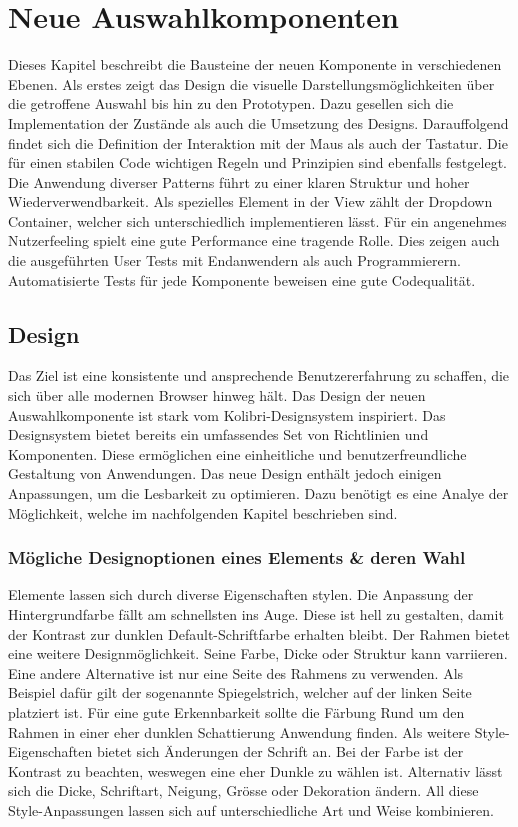 \chapter{Neue Auswahlkomponenten}
\label{chap:newComponent}

Dieses Kapitel beschreibt die Bausteine der neuen Komponente in verschiedenen Ebenen. 
Als erstes zeigt das Design die visuelle Darstellungsmöglichkeiten über die getroffene Auswahl bis hin zu den Prototypen. 
Dazu gesellen sich die Implementation der Zustände als auch die Umsetzung des Designs.
Darauffolgend findet sich die Definition der Interaktion mit der Maus als auch der Tastatur. 
Die für einen stabilen Code wichtigen Regeln und Prinzipien sind ebenfalls festgelegt. 
Die Anwendung diverser Patterns führt zu einer klaren Struktur und hoher Wiederverwendbarkeit. 
Als spezielles Element in der View zählt der Dropdown Container, welcher sich unterschiedlich implementieren lässt. 
Für ein angenehmes Nutzerfeeling spielt eine gute Performance eine tragende Rolle. 
Dies zeigen auch die ausgeführten User Tests mit Endanwendern als auch Programmierern. 
Automatisierte Tests für jede Komponente beweisen eine gute Codequalität. 


\section{Design}
\label{sec:design}

Das Ziel ist eine konsistente und ansprechende Benutzererfahrung zu schaffen, die sich über alle modernen Browser hinweg hält. 
Das Design der neuen Auswahlkomponente ist stark vom Kolibri-Designsystem inspiriert. 
Das Designsystem bietet bereits ein umfassendes Set von Richtlinien und Komponenten. 
Diese ermöglichen eine einheitliche und benutzerfreundliche Gestaltung von Anwendungen. 
Das neue Design enthält jedoch einigen Anpassungen, um die Lesbarkeit zu optimieren. 
Dazu benötigt es eine Analye der Möglichkeit, welche im nachfolgenden Kapitel beschrieben sind. 


\subsection{Mögliche Designoptionen eines Elements \& deren Wahl}
\label{sec:possibleDesignOptions}

Elemente lassen sich durch diverse Eigenschaften stylen. 
Die Anpassung der Hintergrundfarbe fällt am schnellsten ins Auge. 
Diese ist hell zu gestalten, damit der Kontrast zur dunklen Default-Schriftfarbe erhalten bleibt. 
Der Rahmen bietet eine weitere Designmöglichkeit. 
Seine Farbe, Dicke oder Struktur kann varriieren. 
Eine andere Alternative ist nur eine Seite des Rahmens zu verwenden. 
Als Beispiel dafür gilt der sogenannte Spiegelstrich, welcher auf der linken Seite platziert ist. 
Für eine gute Erkennbarkeit sollte die Färbung Rund um den Rahmen in einer eher dunklen Schattierung Anwendung finden. 
Als weitere Style-Eigenschaften bietet sich Änderungen der Schrift an. 
Bei der Farbe ist der Kontrast zu beachten, weswegen eine eher Dunkle zu wählen ist. 
Alternativ lässt sich die Dicke, Schriftart, Neigung, Grösse oder Dekoration ändern. 
All diese Style-Anpassungen lassen sich auf unterschiedliche Art und Weise kombinieren. 

